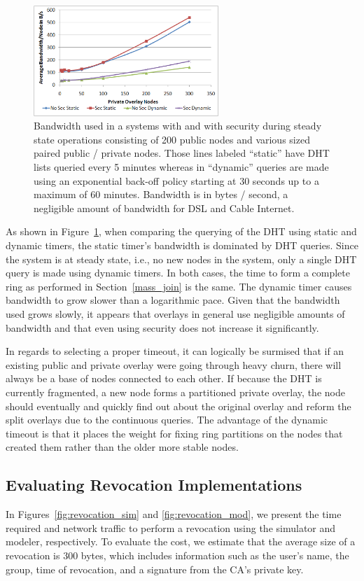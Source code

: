 \documentclass[conference]{IEEEtran}
\begin{document}
\begin{figure}[h]
\centering
\includegraphics[width=2.75in]{bandwidth.eps}
\caption{Bandwidth used in a systems with and with security during steady state
operations consisting of 200 public nodes and various sized paired public /
private nodes.  Those lines labeled ``static'' have DHT lists queried every 5
minutes whereas in ``dynamic'' queries are made using an exponential back-off
policy starting at 30 seconds up to a maximum of 60 minutes.  Bandwidth
is in bytes / second, a negligible amount of bandwidth for DSL and Cable
Internet.}
\label{fig:bandwidth}
\end{figure}

As shown in Figure~\ref{fig:bandwidth}, when comparing the querying of the DHT
using static and dynamic timers, the static timer's bandwidth is dominated by
DHT queries.  Since the system is at steady state, i.e., no new nodes in the
system, only a single DHT query is made using dynamic timers.  In both cases,
the time to form a complete ring as performed in Section~\ref{mass_join} is the
same. The dynamic timer causes bandwidth to grow slower than a logarithmic pace.
Given that the bandwidth used grows slowly, it appears that overlays in general
use negligible amounts of bandwidth and that even using security does not
increase it significantly.

In regards to selecting a proper timeout, it can logically be surmised that
if an existing public and private overlay were going through heavy churn,
there will always be a base of nodes connected to each other.  If because the DHT
is currently fragmented, a new node forms a partitioned private overlay, the node
should eventually and quickly find out about the original overlay and reform
the split overlays due to the continuous queries.  The advantage of the dynamic
timeout is that it places the weight for fixing ring partitions
on the nodes that created them rather than the older more stable nodes. 

\subsection{Evaluating Revocation Implementations}
\label{evaluation_revocation}
In Figures~\ref{fig:revocation_sim} and \ref{fig:revocation_mod}, we present
the time required and network traffic to perform a revocation using the simulator
and modeler, respectively.  To evaluate the cost, we estimate that the average
size of a revocation is 300 bytes, which includes information such as the user's
name, the group, time of revocation, and a signature from the CA's private key.
\end{document}
